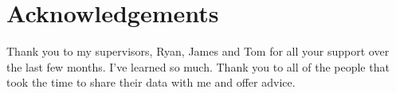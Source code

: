 \chapter{Acknowledgements}
Thank you to my supervisors, Ryan, James and Tom for all your support over the last few months. I've learned so much. Thank you to all of the people that took the time to share their data with me and offer advice.